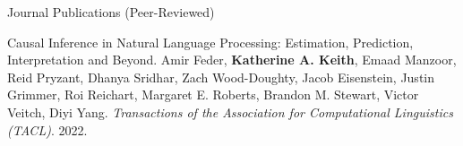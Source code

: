 \documentclass{resume} %
\begin{document}
%
\begin{rSection}{Journal Publications (Peer-Reviewed)}
\begin{etaremune}

\item Causal Inference in Natural Language Processing: Estimation, Prediction, Interpretation and Beyond. Amir Feder, \textbf{Katherine A. Keith}, Emaad Manzoor, Reid Pryzant, Dhanya Sridhar, Zach Wood-Doughty, Jacob Eisenstein, Justin Grimmer, Roi Reichart, Margaret E. Roberts, Brandon M. Stewart, Victor Veitch, Diyi Yang. \emph{Transactions of the Association for Computational Linguistics (TACL)}. 2022. 

\end{etaremune}
\end{rSection}
\end{document}
